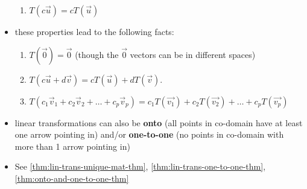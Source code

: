 \documentclass[a4paper,12pt]{article}
\theoremstyle{definition}
\theoremstyle{definition}
\newcommand{\finiteadd}[3]{#1 + #2 + \ldots + #3}
\newcommand{\lincombo}[4]{\finiteadd{#1_1#2_1}{#1_2#2_2}{#1_#3#2_#4}}
\begin{document}
\begin{itemize}
\begin{enumerate}
			\item $T(c\vec{u}) = cT(\vec{u})$
		\end{enumerate}
		
		\item these properties lead to the following facts:
		\begin{enumerate}
			\item $T(\vec{0}) = \vec{0}$ (though the $\vec{0}$ vectors can be in different spaces)
			
			\item $T(c\vec{u} + d\vec{v}) = cT(\vec{u}) + dT(\vec{v})$.
			
			\item $T(\lincombo{c}{\vec{v}}{p}{p}) = \finiteadd{c_1T(\vec{v_1})}{c_2T(\vec{v_2})}{c_pT(\vec{v_p})}$
		\end{enumerate}
		
		\item linear transformations can also be \textbf{onto} (all points in co-domain have at least one arrow pointing in) and/or \textbf{one-to-one} (no points in co-domain with more than 1 arrow pointing in)
		
		\item See \autoref{thm:lin-trans-unique-mat-thm}, \autoref{thm:lin-trans-one-to-one-thm}, \autoref{thm:onto-and-one-to-one-thm}
	\end{itemize}
	
\end{document}

